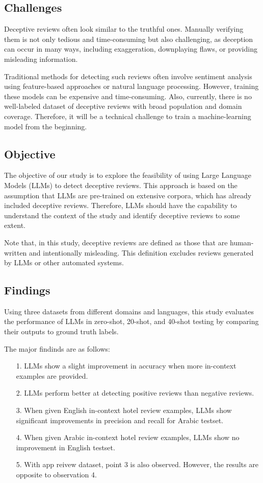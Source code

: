 \documentclass[sigconf, nonacm]{acmart}
\theoremstyle{definition}
\begin{document}
\subsection{Challenges}
Deceptive reviews often look similar to the truthful ones. Manually verifying them is not only tedious and time-consuming but also challenging, as deception can occur in many ways, including exaggeration, downplaying flaws, or providing misleading information.

Traditional methods for detecting such reviews often involve sentiment analysis using feature-based approaches or natural language processing. However, training these models can be expensive and time-consuming. Also, currently, there is no well-labeled dataset of deceptive reviews with broad population and domain coverage. Therefore, it will be a technical challenge to train a machine-learning model from the beginning.

\subsection{Objective}
The objective of our study is to explore the feasibility of using Large Language Models (LLMs) to detect deceptive reviews. This approach is based on the assumption that LLMs are pre-trained on extensive corpora, which has already included deceptive reviews. Therefore, LLMs should have the capability to understand the context of the study and identify deceptive reviews to some extent.

Note that, in this study, deceptive reviews are defined as those that are human-written and intentionally misleading. This definition excludes reviews generated by LLMs or other automated systems.

\subsection{Findings}
Using three datasets from different domains and languages, this study evaluates the performance of LLMs in zero-shot, 20-shot, and 40-shot testing by comparing their outputs to ground truth labels.

\noindent The major findinds are as follows:
\begin{itemize}
  \item[1.] LLMs show a slight improvement in accuracy when more in-context examples are provided.
  \item[2.] LLMs perform better at detecting positive reviews than negative reviews.
  \item[3.] When given English in-context hotel review examples, LLMs show significant improvements in precision and recall for Arabic testset.
  \item[4.] When given Arabic in-context hotel review examples, LLMs show no improvement in English testset.
  \item[5.] With app reivew dataset, point 3 is also observed. However, the results are opposite to observation 4.
\end{itemize}
\end{document}
